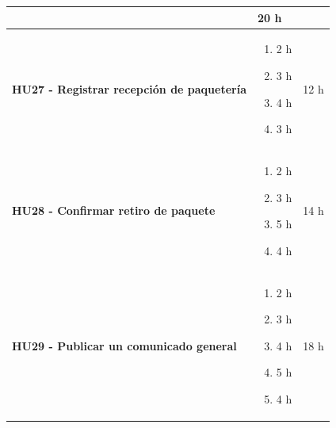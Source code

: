 \begin{longtable}{|p{10.5cm}|p{2.5cm}|c|}
        &
            20 h
    
    \\ \hline
        
            \textbf{HU27 - Registrar recepción de paquetería} 
        
        &

            \begin{enumerate}[leftmargin=*,nosep]
                \item 2 h
                \item 3 h
                \item 4 h
                \item 3 h
            \end{enumerate} 
        
        &
            12 h
    
    \\ \hline
        
            \textbf{HU28 - Confirmar retiro de paquete} 
        
        &

            \begin{enumerate}[leftmargin=*,nosep]
                \item 2 h
                \item 3 h
                \item 5 h
                \item 4 h
            \end{enumerate} 
        
        &
            14 h
    
    \\ \hline
        
            \textbf{HU29 - Publicar un comunicado general} 
        
        &

            \begin{enumerate}[leftmargin=*,nosep]
                \item 2 h
                \item 3 h
                \item 4 h
                \item 5 h
                \item 4 h
            \end{enumerate} 
        
        &
            18 h
    
    \\ \hline
        

\end{longtable}
